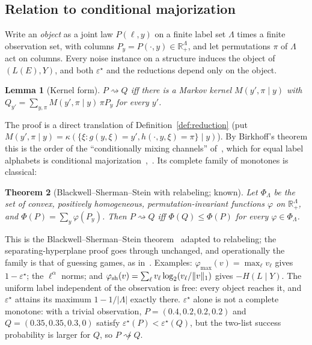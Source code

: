 \documentclass[11pt,a4paper]{article}
\theoremstyle{plain}
\newtheorem{theorem}{Theorem}[section]
\newtheorem{lemma}[theorem]{Lemma}
\theoremstyle{definition}
\theoremstyle{remark}
\newcommand{\err}{\varepsilon^{\star}}
\newcommand{\red}{\rightsquigarrow}
\begin{document}
\subsection{Relation to conditional majorization}\label{sec:majorization}

Write an \emph{object} as a joint law $P(\ell,y)$ on a finite label set $\Lambda$ times a finite observation set, with columns $P_y=P(\cdot,y)\in\mathbb R_+^\Lambda$, and let permutations $\pi$ of $\Lambda$ act on columns. Every noise instance on a structure induces the object of $(L(E),Y)$, and both $\err$ and the reductions depend only on the object.

\begin{lemma}[Kernel form]\label{lem:kernel}
$P\red Q$ iff there is a Markov kernel $M(y',\pi\mid y)$ with $Q_{y'}=\sum_{y,\pi}M(y',\pi\mid y)\,\pi P_y$ for every $y'$.
\end{lemma}

\noindent The proof is a direct translation of Definition~\ref{def:reduction} (put $M(y',\pi\mid y)=\kappa(\{\xi:g(y,\xi)=y',h(\cdot,y,\xi)=\pi\}\mid y)$). By Birkhoff's theorem this is the order of the ``conditionally mixing channels'' of~\cite[Def.~2.7]{RHT}, which for equal label alphabets is conditional majorization~\cite{GGHKLN},~\cite[Remark~2.10]{RHT}. Its complete family of monotones is classical:

\begin{theorem}[Blackwell--Sherman--Stein with relabeling; known]\label{thm:complete}
Let $\Phi_\Lambda$ be the set of convex, positively homogeneous, permutation-invariant functions $\varphi$ on $\mathbb R_+^\Lambda$, and $\Phi(P)=\sum_y\varphi(P_y)$. Then $P\red Q$ iff $\Phi(Q)\le\Phi(P)$ for every $\varphi\in\Phi_\Lambda$.
\end{theorem}

\noindent This is the Blackwell--Sherman--Stein theorem~\cite{Blackwell,Torgersen} adapted to relabeling; the separating-hyperplane proof goes through unchanged, and operationally the family is that of guessing games, as in~\cite{BGG,TakagiRegula,RBL}. Examples: $\varphi_{\max}(v)=\max_\ell v_\ell$ gives $1-\err$; the $\ell^\alpha$ norms; and $\varphi_{\rm sh}(v)=\sum_\ell v_\ell\log_2(v_\ell/\|v\|_1)$ gives $-H(L\mid Y)$. The uniform label independent of the observation is free: every object reaches it, and $\err$ attains its maximum $1-1/|\Lambda|$ exactly there. $\err$ alone is not a complete monotone: with a trivial observation, $P=(0.4,0.2,0.2,0.2)$ and $Q=(0.35,0.35,0.3,0)$ satisfy $\err(P)<\err(Q)$, but the two-list success probability is larger for $Q$, so $P\not\red Q$.
\end{document}

